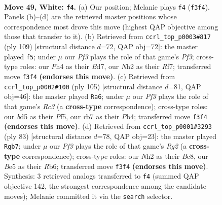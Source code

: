 \documentclass[11pt]{article}
\begin{document}
\clearpage

\begin{figure}[p]\centering
\begin{subfigure}{0.46\textwidth}\centering
\resizebox{\linewidth}{!}{%
\newchessgame
\chessboard[
  setfen={5b1r/1r1k2p1/p1p5/Pp1bBp1p/2p4P/4PPP1/1P2K2N/R5R1 w - - 2 49},
  showmover=false,
  pgfstyle=straightmove, color=movearrow, markmove={f3-f4}
]}
\caption{}
\end{subfigure}\hfill
\begin{subfigure}{0.46\textwidth}\centering
\resizebox{\linewidth}{!}{%
\newchessgame
\chessboard[
  setfen={8/3b1r1r/1pkp1pn1/p1p5/P1P1P2p/1PB2P2/6PR/3KRB2 b - - 31 55},
  showmover=false,
  pgfstyle=straightmove, color=movearrow, markmove={f6-f5}
]}
\caption{}
\end{subfigure}
\\[4pt]
\begin{subfigure}{0.46\textwidth}\centering
\resizebox{\linewidth}{!}{%
\newchessgame
\chessboard[
  setfen={7r/2p2k2/2r3p1/2b1PpPp/1p1p1P2/pP1P2P1/P1P2BK1/R1R5 b - - 50 53},
  showmover=false,
  pgfstyle=straightmove, color=movearrow, markmove={c6-a6}
]}
\caption{}
\end{subfigure}\hfill
\begin{subfigure}{0.46\textwidth}\centering
\resizebox{\linewidth}{!}{%
\newchessgame
\chessboard[
  setfen={2b2k2/6r1/pr1p4/2pPn2N/4P1p1/6P1/RP3PBP/1R4K1 b - - 0 42},
  showmover=false,
  pgfstyle=straightmove, color=movearrow, markmove={g7-b7}
]}
\caption{}
\end{subfigure}
\caption{\textbf{Move 49, White: \texttt{f4}.} (a) Our position; Melanie plays \texttt{f4} (\texttt{f3f4}). Panels (b)--(d) are the retrieved master positions whose correspondence most drove this move (highest QAP objective among those that transfer to it). (b) Retrieved from \texttt{ccrl\_top\_p0003\#817} (ply 109) [structural distance $d$=72, QAP obj=72]: the master played \texttt{f5}; under $\mu$ our \emph{Pf3} plays the role of that game's \emph{Pf3}; cross-type roles: our \emph{P}h4 as their \emph{B}d7, our \emph{N}h2 as their \emph{R}f7; transferred move \texttt{f3f4} \textbf{(endorses this move)}. (c) Retrieved from \texttt{ccrl\_top\_p0002\#100} (ply 105) [structural distance $d$=81, QAP obj=46]: the master played \texttt{Ra6}; under $\mu$ our \emph{Pf3} plays the role of that game's \emph{Rc3} (a \textbf{cross-type} correspondence); cross-type roles: our \emph{b}d5 as their \emph{P}f5, our \emph{r}b7 as their \emph{P}b4; transferred move \texttt{f3f4} \textbf{(endorses this move)}. (d) Retrieved from \texttt{ccrl\_top\_p0001\#3293} (ply 83) [structural distance $d$=78, QAP obj=23]: the master played \texttt{Rgb7}; under $\mu$ our \emph{Pf3} plays the role of that game's \emph{Rg2} (a \textbf{cross-type} correspondence); cross-type roles: our \emph{N}h2 as their \emph{B}c8, our \emph{B}e5 as their \emph{R}b6; transferred move \texttt{f3f4} \textbf{(endorses this move)}. Synthesis: 3 retrieved analogs transferred to \texttt{f4} (summed QAP objective 142, the strongest correspondence among the candidate moves); Melanie committed it via the \texttt{search} selector.}
\label{fig:thought-m96}
\end{figure}
\end{document}

